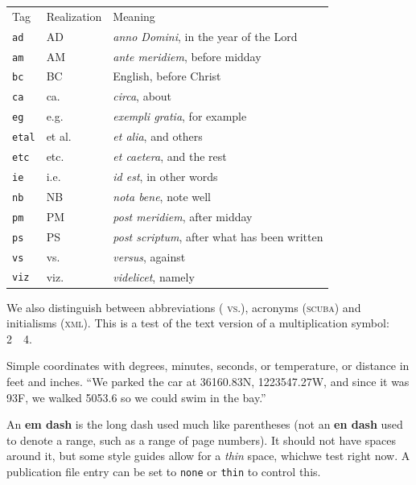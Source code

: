 \documentclass{sn-jnl}
\theoremstyle{thmstyleone}%
\theoremstyle{thmstyletwo}%
\theoremstyle{thmstylethree}%
\newcommand{\tabularfont}{\relax}
\newcommand{\mono}[1]{\texttt{#1}}
\newcommand{\initialism}[1]{\textsc{\MakeLowercase{#1}}}
\newcommand{\acronym}[1]{\textsc{\MakeLowercase{#1}}}
\newcommand{\abbreviation}[1]{%
\textsc{\MakeLowercase{#1}}}
\newcommand{\terminology}[1]{\textbf{#1}}
\numberwithin{equation}{section}
\begin{document}
\begin{center}%
{\tabularfont%
\begin{tabular}{lll}
Tag&Realization&Meaning\tabularnewline[0pt]
\mono{ad}&AD&\textit{anno Domini}, in the year of the Lord\tabularnewline[0pt]
\mono{am}&AM&\textit{ante meridiem}, before midday\tabularnewline[0pt]
\mono{bc}&BC&English, before Christ\tabularnewline[0pt]
\mono{ca}&ca.\@&\textit{circa}, about\tabularnewline[0pt]
\mono{eg}&e.g.\@&\textit{exempli gratia}, for example\tabularnewline[0pt]
\mono{etal}&et al.\@&\textit{et alia}, and others\tabularnewline[0pt]
\mono{etc}&etc.\@&\textit{et caetera}, and the rest\tabularnewline[0pt]
\mono{ie}&i.e.\@&\textit{id est}, in other words\tabularnewline[0pt]
\mono{nb}&NB&\textit{nota bene}, note well\tabularnewline[0pt]
\mono{pm}&PM&\textit{post meridiem}, after midday\tabularnewline[0pt]
\mono{ps}&PS&\textit{post scriptum}, after what has been written\tabularnewline[0pt]
\mono{vs}&vs.\@&\textit{versus}, against\tabularnewline[0pt]
\mono{viz}&viz.\@&\textit{videlicet}, namely
\end{tabular}
}%
\end{center}%
We also distinguish between abbreviations (\abbreviation{vs.}), acronyms (\acronym{SCUBA}) and initialisms (\initialism{XML}).  This is a test of the text version of a multiplication symbol: 2~\texttimes{}~4.%
\par
Simple coordinates with degrees, minutes, seconds, or temperature, or distance in feet and inches.  ``We parked the car at 36\textdegree{}16\textquotesingle{}0.83\textquotesingle\textquotesingle{}N, 122\textdegree{}35\textquotesingle{}47.27\textquotesingle\textquotesingle{}W, and since it was 93\textdegree{}F, we walked 505\textquotesingle{}3.6\textquotesingle\textquotesingle{} so we could swim in the bay.''%
\par
An \terminology{em dash} is the long dash used much like parentheses (not an \terminology{en dash} used to denote a range, such as a range of page numbers).  It should not have spaces around it, but some style guides allow for a \emph{thin} space, which\textemdash{}we test right now.  A publication file entry can be set to \mono{none} or \mono{thin} to control this.%
%
%
\typeout{************************************************}
\typeout{************************************************}
%
\end{document}
